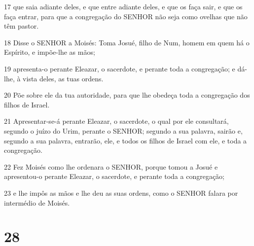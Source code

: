 \par 17 que saia adiante deles, e que entre adiante deles, e que os faça sair, e que os faça entrar, para que a congregação do SENHOR não seja como ovelhas que não têm pastor.
\par 18 Disse o SENHOR a Moisés: Toma Josué, filho de Num, homem em quem há o Espírito, e impõe-lhe as mãos;
\par 19 apresenta-o perante Eleazar, o sacerdote, e perante toda a congregação; e dá-lhe, à vista deles, as tuas ordens.
\par 20 Põe sobre ele da tua autoridade, para que lhe obedeça toda a congregação dos filhos de Israel.
\par 21 Apresentar-se-á perante Eleazar, o sacerdote, o qual por ele consultará, segundo o juízo do Urim, perante o SENHOR; segundo a sua palavra, sairão e, segundo a sua palavra, entrarão, ele, e todos os filhos de Israel com ele, e toda a congregação.
\par 22 Fez Moisés como lhe ordenara o SENHOR, porque tomou a Josué e apresentou-o perante Eleazar, o sacerdote, e perante toda a congregação;
\par 23 e lhe impôs as mãos e lhe deu as suas ordens, como o SENHOR falara por intermédio de Moisés.

\chapter{28}

